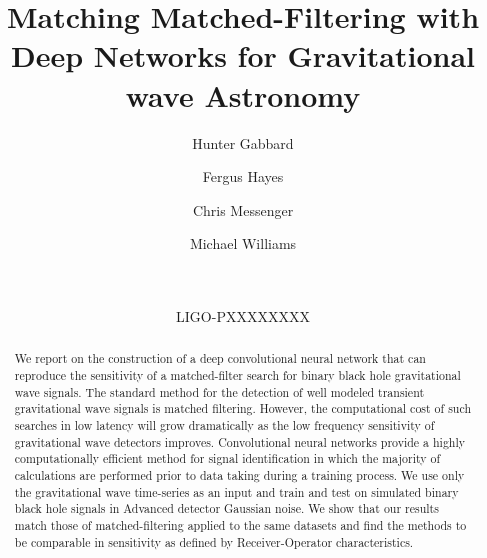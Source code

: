 \documentclass[%
showpacs,
 amsmath,amssymb,
 aps,
 twocolumn,
 prl,
 reprint,
floatfix,
]{revtex4-1}
\newcommand{\dcc}{LIGO-PXXXXXXXX}
\begin{document}

%
%
\title{Matching Matched-Filtering with Deep Networks for Gravitational wave Astronomy}

\author{Hunter Gabbard}
\author{Fergus Hayes}
\author{Chris Messenger}
\author{Michael Williams}


\date{\commitDATE\\\mbox{\small \commitID}\\\mbox{\dcc}}

%
%
\begin{abstract} 
%
We report on the construction of a deep convolutional neural network that can
reproduce the sensitivity of a matched-filter search for binary black hole
gravitational wave signals. The standard method for the detection of well
modeled transient gravitational wave signals is matched filtering. However,
the computational cost of such searches in low latency will grow dramatically
as the low frequency sensitivity of gravitational wave detectors improves.
Convolutional neural networks provide a highly computationally efficient method
for signal identification in which the majority of calculations are performed
prior to data taking during a training process. We use only the gravitational
wave time-series as an input and train and test on simulated binary black hole
signals in Advanced detector Gaussian noise. We show that our results match
those of matched-filtering applied to the same datasets and find the methods
to be comparable in sensitivity as defined by Receiver-Operator
characteristics. 
%
\end{abstract}



\end{document}
